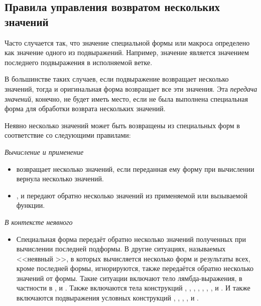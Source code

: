\subsection{Правила управления возвратом нескольких значений}

Часто случается так, что значение специальной формы или макроса определено как
значение одного из подвыражений.
Например, значение  является значением последнего подвыражения в
исполняемой ветке.

В большинстве таких случаев, если подвыражение возвращает несколько значений,
тогда и оригинальная форма возвращает все эти значения. Эта \emph{передача
  значений}, конечно, не будет иметь место, если не была выполнена специальная
форма для обработки возврата нескольких значений.

Неявно несколько значений может быть возвращены из специальных форм в
соответствие со следующими правилами:
\goodbreak
\begin{flushdesc}
\item[\emph{Вычисление и применение}]\leavevmode
\begin{itemize}

\item
{} возвращает несколько значений, если переданная ему форму при
вычислении вернула несколько значений.

\item
{},  и  передают обратно
несколько значений из применяемой или вызываемой функции.
\end{itemize}

\item[\emph{В контексте неявного \cdf{progn}}]\leavevmode
\begin{itemize}

\item
Специальная форма 
передаёт обратно несколько значений полученных при вычислении последней
подформы. В другие ситуациях, называемых <<неявный >>, в которых
вычисляется несколько форм и результаты всех, кроме последней формы,
игнорируются, также передаётся обратно несколько значений от формы.
Такие ситуации включают тело лямбда-выражения, в частности в ,
 и .
Также включаются тела конструкций
,
, ,
, , ,
,
 и .
И также включаются подвыражения условных конструкций 
, ,
, ,  и .
\end{itemize}
\end{flushdesc}

